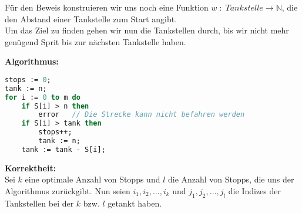 \documentclass[11pt,a4paper,ngerman]{article}
\begin{document}
Für den Beweis konstruieren wir uns noch eine Funktion $w \; : \; Tankstelle \longrightarrow \mathbb{N}$, die den Abstand einer Tankstelle zum Start angibt.\\


Um das Ziel zu finden gehen wir nun die Tankstellen durch, bis wir nicht mehr genügend Sprit bis zur nächsten Tankstelle haben.

\textbf{Algorithmus:}
\begin{lstlisting}[language=Pascal]
stops := 0;
tank := n;
for i := 0 to m do
	if S[i] > n then
		error	// Die Strecke kann nicht befahren werden
	if S[i] > tank then
		stops++;
		tank := n;
	tank := tank - S[i];		
\end{lstlisting}

\textbf{Korrektheit:}\\

Sei $k$ eine optimale Anzahl von Stopps und $l$ die Anzahl von Stopps, die uns der Algorithmus zurückgibt. Nun seien $i_1 , i_2 , ..., i_k$ und $j_1 , j_2 , ... , j_l$ die Indizes der Tankstellen bei der $k$ bzw. $l$ getankt haben.\\
\end{document}
